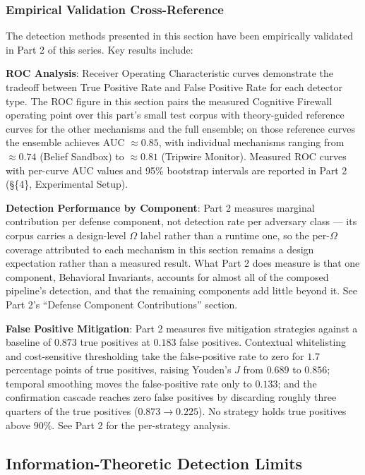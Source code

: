 \documentclass[
]{article}
\begin{document}
\subsubsection{Empirical Validation
Cross-Reference}\label{empirical-validation-cross-reference}

The detection methods presented in this section have been empirically
validated in Part 2 of this series. Key results include:

\textbf{ROC Analysis}: Receiver Operating Characteristic curves
demonstrate the tradeoff between True Positive Rate and False Positive
Rate for each detector type. The ROC figure in this section pairs the
measured Cognitive Firewall operating point over this part's small test
corpus with theory-guided reference curves for the other mechanisms and
the full ensemble; on those reference curves the ensemble achieves AUC
\(\approx 0.85\), with individual mechanisms ranging from
\(\approx 0.74\) (Belief Sandbox) to \(\approx 0.81\) (Tripwire
Monitor). Measured ROC curves with per-curve AUC values and 95\%
bootstrap intervals are reported in Part 2 (\S\{4\}, Experimental
Setup).

\textbf{Detection Performance by Component}: Part 2 measures marginal
contribution per defense component, not detection rate per adversary
class --- its corpus carries a design-level \(\Omega\) label rather than
a runtime one, so the per-\(\Omega\) coverage attributed to each
mechanism in this section remains a design expectation rather than a
measured result. What Part 2 does measure is that one component,
Behavioral Invariants, accounts for almost all of the composed
pipeline's detection, and that the remaining components add little
beyond it. See Part 2's ``Defense Component Contributions'' section.

\textbf{False Positive Mitigation}: Part 2 measures five mitigation
strategies against a baseline of \(0.873\) true positives at \(0.183\)
false positives. Contextual whitelisting and cost-sensitive thresholding
take the false-positive rate to zero for \(1.7\) percentage points of
true positives, raising Youden's \(J\) from \(0.689\) to \(0.856\);
temporal smoothing moves the false-positive rate only to \(0.133\); and
the confirmation cascade reaches zero false positives by discarding
roughly three quarters of the true positives (\(0.873 \to 0.225\)). No
strategy holds true positives above \(90\%\). See Part 2 for the
per-strategy analysis.

\subsection{Information-Theoretic Detection
Limits}\label{sec:it-detection-limits}
\end{document}
